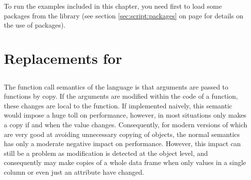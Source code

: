 \documentclass[krantz2]{krantz}\usepackage{knitr}
\begin{document}
\begin{knitrout}\footnotesize
{}\color{fgcolor}\begin{kframe}
\begin{alltt}
\hlopt{::}
\end{alltt}
\end{kframe}
\end{knitrout}

To run the examples included in this chapter, you need first to load some packages from the library (see section \ref{sec:script:packages} on page \pageref{sec:script:packages} for details on the use of packages).

\begin{knitrout}\footnotesize
{}\color{fgcolor}\begin{kframe}
\begin{alltt}
\end{alltt}
\end{kframe}
\end{knitrout}

\section[Replacements for \texttt{data.frame}]{Replacements for }
\subsection{}
The function call semantics of the \Rlang language is that arguments are passed to functions by copy. If the arguments are modified within the code of a function, these changes are local to the function. If implemented naively, this semantic would impose a huge toll on performance, however, \Rlang in most situations only makes a copy if and when the value changes. Consequently, for modern versions of \Rlang which are very good at avoiding unnecessary copying of objects, the normal \Rlang semantics has only a moderate negative impact on performance. However, this impact can still be a problem as modification is detected at the object level, and consequently \Rlang may make copies of a whole data frame when only values in a single column or even just an attribute have changed.
\end{document}
